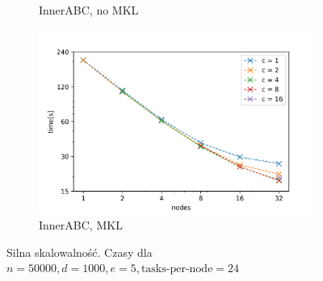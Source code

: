 \documentclass{article}
\begin{document}
\begin{figure}[ht!]
\begin{subfigure}[b]{0.45\textwidth}
        \caption{InnerABC, no MKL}
    \end{subfigure}
    \begin{subfigure}[b]{0.45\textwidth}
        \includegraphics[width=\textwidth]{charts/s_50000_1000_5_i_m}
        \caption{InnerABC, MKL}
    \end{subfigure}
    \caption{Silna skalowalność. Czasy dla $n=50000, d=1000, e=5, \text{tasks-per-node}=24$}\label{fig:animals}
    \label{fig:scal_strong_1}
\end{figure}
\end{document}
